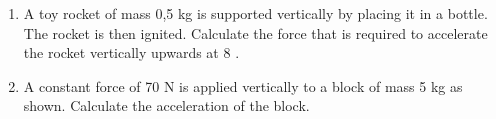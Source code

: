 {\begin{enumerate}
{\begin{enumerate}
      \end{enumerate}}
  \item{A toy rocket of mass 0,5 kg is supported vertically by placing it in a bottle. The rocket is then ignited. Calculate the force that is required to accelerate the rocket vertically upwards at 8 \mss.}
  \item{A constant force of 70 N is applied vertically to a block of mass 5 kg as shown. Calculate the acceleration of the block.
      \begin{figure}[H]
        \begin{center}
        \end{center}
      \end{figure}
    }

\end{enumerate}}
